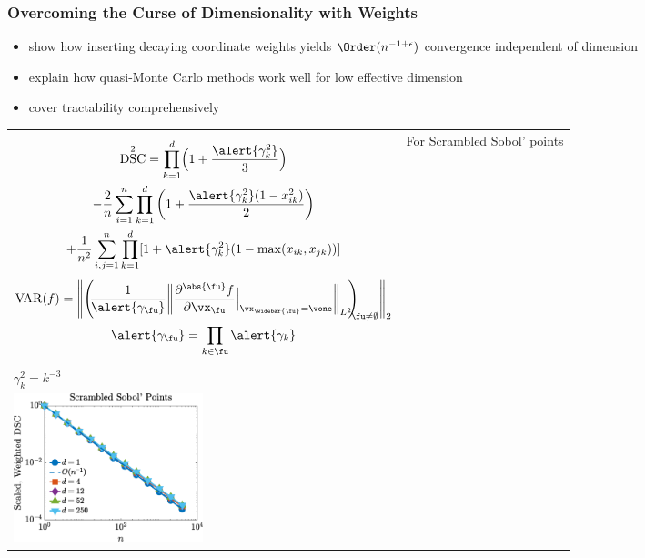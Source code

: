 \documentclass[10pt,compress,xcolor={usenames,dvipsnames}]{beamer} %
\DeclareMathOperator{\disc}{DSC}
\DeclareMathOperator{\Var}{VAR}
\begin{document}
\begin{frame}
	\frametitle{Overcoming the Curse of Dimensionality with Weights}
	\vspace{-4ex}
	\begin{itemize}
		\item 	{} show how inserting decaying coordinate weights yields $\Order(n^{-1+\epsilon})$ convergence \alert{independent of dimension}
		\item {} explain how quasi-Monte Carlo methods work well for \alert{low effective dimension}
		\item {} cover \alert{tractability} comprehensively
	\end{itemize}
	\vspace{-7ex}
	\begin{tabular}{m{6cm}>{\centering}m{5.5cm}}
		\begin{multline*}
		\disc^2 = \prod_{k=1}^d\Bigl(1 + \frac{\alert{\gamma_k^2}}{3}\Bigr) \\
			- \frac{2}{n} \sum_{i=1}^n \prod_{k=1}^d \left (1 + \frac{\alert{\gamma_k^2}(1 - x_{ik}^2)}{2} \right) \\ + \frac{1}{n^2}\sum_{i,j=1}^n \prod_{k = 1}^d [1 + \alert{\gamma_k^2}( 1 - \max(x_{ik},x_{jk}))]
		\end{multline*}
		\vspace{-4ex}
		\begin{gather*} 	\Var(f) = \Biggl \lVert \Biggl ( \!\!\frac{1}{\alert{\gamma_{\fu}} }\biggl \lVert\frac{\partial^{\abs{\fu}} f}{\partial \vx_\fu} \Bigr \rvert_{\vx_{\widebar{\fu}} = \vone}\biggr\rVert_{L^2}\!\!\Biggr )_{\!\!\!\!\fu \ne \emptyset} \Biggr \rVert_2 \\
		\alert{\gamma_{\fu}} = \prod_{k \in \fu} \alert{\gamma_k}
		\end{gather*}
		& 
		For Scrambled Sobol' points \\ $\gamma_k^2 = k^{-3}$ \\
		\includegraphics[width = 5.5cm]{ProgramsImages/WtL2Disc.eps}
	\end{tabular}
\end{frame}
\end{document}
